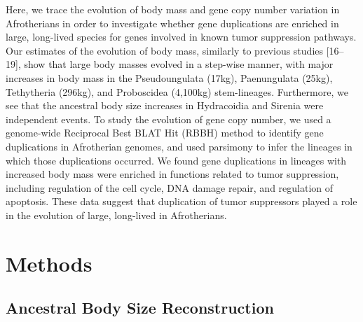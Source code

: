 \documentclass[10pt,letterpaper]{article}
\begin{document}
Here, we trace the evolution of body mass and gene copy number variation
in Afrotherians in order to investigate whether gene duplications are
enriched in large, long-lived species for genes involved in known tumor
suppression pathways. Our estimates of the evolution of body mass,
similarly to previous studies {[}16--19{]}, show that large body masses
evolved in a step-wise manner, with major increases in body mass in the
Pseudoungulata (17kg), Paenungulata (25kg), Tethytheria (296kg), and
Proboscidea (4,100kg) stem-lineages. Furthermore, we see that the
ancestral body size increases in Hydracoidia and Sirenia were
independent events. To study the evolution of gene copy number, we used
a genome-wide Reciprocal Best BLAT Hit (RBBH) method to identify gene
duplications in Afrotherian genomes, and used parsimony to infer the
lineages in which those duplications occurred. We found gene
duplications in lineages with increased body mass were enriched in
functions related to tumor suppression, including regulation of the cell
cycle, DNA damage repair, and regulation of apoptosis. These data
suggest that duplication of tumor suppressors played a role in the
evolution of large, long-lived in Afrotherians.

\hypertarget{methods}{%
\section{Methods}\label{methods}}

\hypertarget{ancestral-body-size-reconstruction}{%
\subsection{Ancestral Body Size
Reconstruction}\label{ancestral-body-size-reconstruction}}
\end{document}

